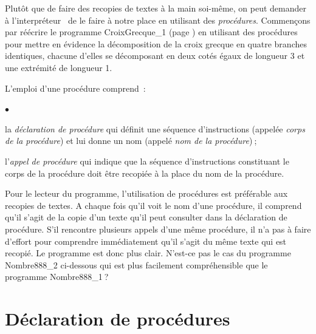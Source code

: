 Plutôt que de faire des recopies de textes à la main soi-même, on peut 
demander à l'interpréteur \python\ de le faire à notre place en utilisant 
des {\em procédures}. Commençons par réécrire le programme 
{\idt CroixGrecque\_1} (page \pageref{prog:CroixGrecque_1}) en uti\-li\-sant des procédures pour mettre en 
évidence la décomposition de la croix grecque en 
quatre bran\-ches identiques, chacune d'elles se décomposant en deux 
cotés égaux de lon\-gueur 3 et une extrémité de lon\-gueur 1.

\newpage
\vspace*{3cm}%
\vspace*{-3cm}%


\noindent L'emploi d'une procédure comprend~:
\begin{list}{$\scriptscriptstyle\bullet$}{
}
\item la {\em déclaration de procédure} qui définit une séquence 
d'instructions (appelée {\em corps de la procédure}) et lui donne un 
nom (appelé {\em nom de la procédure})$\:$;
\item l'{\em appel de procédure} qui indique que la séquence 
d'instructions cons\-ti\-tuant le corps de la procédure doit être recopiée 
à la place du nom de la procédure.
\end{list}

\noindent Pour le lecteur du programme, l'utilisation de procédures est 
préférable aux recopies de textes. A chaque fois qu'il voit le
nom d'une procédure, il comprend qu'il s'agit de la copie d'un texte
qu'il peut consulter dans la déclaration de procédure. S'il rencontre
plusieurs appels d'une même procédure, il n'a pas à faire d'effort 
pour comprendre immédiatement qu'il s'agit du même texte qui est
recopié. Le programme est donc plus clair. N'est-ce pas le cas du
programme {\idt Nombre888\_2} ci-dessous qui est plus facilement 
compréhensible que le programme {\idt Nombre888\_1}$\:$? 

\vspace{\baselineskip}
\vspace*{2cm}%
\vspace*{-2cm}%


\section{Déclaration de procédures} 

